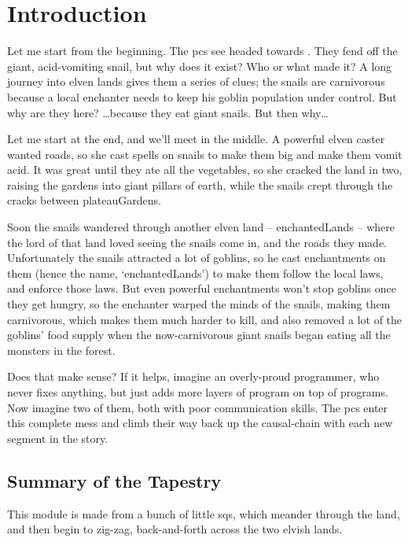 \section{Introduction}

\begin{multicols}{2}

\noindent
Let me start from the beginning.
The \glspl{pc} see  headed towards .
They fend off the giant, acid-vomiting snail, but why does it exist?
Who or what made it?
A long journey into elven lands gives them a series of clues; the snails are carnivorous because a local enchanter needs to keep his goblin population under control.
But why are they here?  \ldots because they eat giant snails.
But then why\ldots

Let me start at the end, and we'll meet in the middle.
A powerful elven caster wanted roads, so she cast spells on snails to make them big and make them vomit acid.
It was great until they ate all the vegetables, so she cracked the land in two, raising the gardens into giant pillars of earth, while the snails crept through the cracks between \gls{plateauGardens}.

Soon the snails wandered through another elven land -- \gls{enchantedLands} -- where the lord of that land loved seeing the snails come in, and the roads they made.
Unfortunately the snails attracted a lot of goblins, so he cast enchantments on them (hence the name, `\gls{enchantedLands}') to make them follow the local laws, and enforce those laws.
But even powerful enchantments won't stop goblins once they get hungry, so the enchanter warped the minds of the snails, making them carnivorous, which makes them much harder to kill, and also removed a lot of the goblins' food supply when the now-carnivorous giant snails began eating all the \glspl{monster} in the forest.

Does that make sense?
If it helps, imagine an overly-proud programmer, who never fixes anything, but just adds more layers of program on top of programs.
Now imagine two of them, both with poor communication skills.
The \glspl{pc} enter this complete mess and climb their way back up the causal-chain with each new \gls{segment} in the story.

\subsection{Summary of the Tapestry}

This module is made from a bunch of little \glspl{sq}, which meander through the land, and then begin to zig-zag, back-and-forth across the two elvish lands.


\end{multicols}
